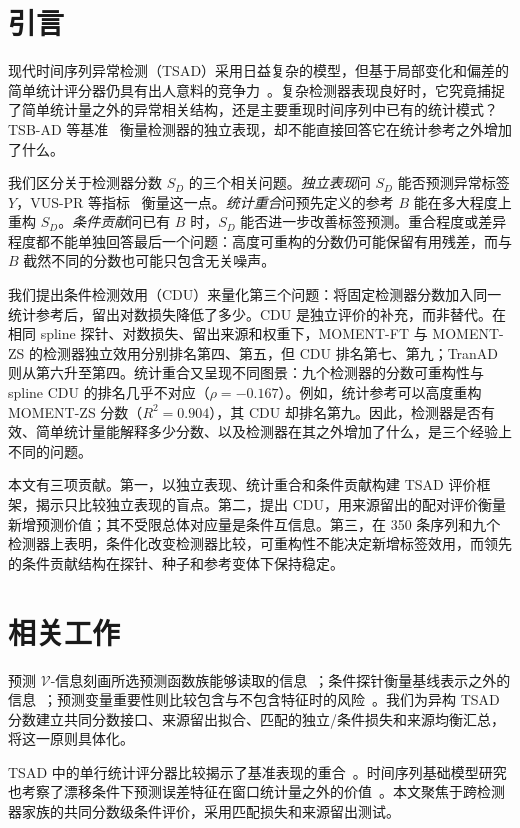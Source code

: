 \section{引言}
现代时间序列异常检测（TSAD）采用日益复杂的模型，但基于局部变化和偏差的简单统计评分器仍具有出人意料的竞争力~\cite{zhu2026oneliners}。复杂检测器表现良好时，它究竟捕捉了简单统计量之外的异常相关结构，还是主要重现时间序列中已有的统计模式？TSB-AD 等基准~\cite{liu2024tsbad} 衡量检测器的独立表现，却不能直接回答它在统计参考之外增加了什么。

我们区分关于检测器分数 $S_D$ 的三个相关问题。\emph{独立表现}问 $S_D$ 能否预测异常标签 $Y$，VUS-PR 等指标~\cite{paparrizos2022vus} 衡量这一点。\emph{统计重合}问预先定义的参考 $B$ 能在多大程度上重构 $S_D$。\emph{条件贡献}问已有 $B$ 时，$S_D$ 能否进一步改善标签预测。重合程度或差异程度都不能单独回答最后一个问题：高度可重构的分数仍可能保留有用残差，而与 $B$ 截然不同的分数也可能只包含无关噪声。

我们提出条件检测效用（CDU）来量化第三个问题：将固定检测器分数加入同一统计参考后，留出对数损失降低了多少。CDU 是独立评价的补充，而非替代。在相同 spline 探针、对数损失、留出来源和权重下，MOMENT-FT 与 MOMENT-ZS 的检测器独立效用分别排名第四、第五，但 CDU 排名第七、第九；TranAD 则从第六升至第四。统计重合又呈现不同图景：九个检测器的分数可重构性与 spline CDU 的排名几乎不对应（$\rho=-0.167$）。例如，统计参考可以高度重构 MOMENT-ZS 分数（$R^2=0.904$），其 CDU 却排名第九。因此，检测器是否有效、简单统计量能解释多少分数、以及检测器在其之外增加了什么，是三个经验上不同的问题。

本文有三项贡献。第一，以独立表现、统计重合和条件贡献构建 TSAD 评价框架，揭示只比较独立表现的盲点。第二，提出 CDU，用来源留出的配对评价衡量新增预测价值；其不受限总体对应量是条件互信息。第三，在 350 条序列和九个检测器上表明，条件化改变检测器比较，可重构性不能决定新增标签效用，而领先的条件贡献结构在探针、种子和参考变体下保持稳定。

\section{相关工作}
预测 $\mathcal V$-信息刻画所选预测函数族能够读取的信息~\cite{xu2020usable}；条件探针衡量基线表示之外的信息~\cite{hewitt2021conditional}；预测变量重要性则比较包含与不包含特征时的风险~\cite{williamson2023importance}。我们为异构 TSAD 分数建立共同分数接口、来源留出拟合、匹配的独立/条件损失和来源均衡汇总，将这一原则具体化。

TSAD 中的单行统计评分器比较揭示了基准表现的重合~\cite{zhu2026oneliners}。时间序列基础模型研究也考察了漂移条件下预测误差特征在窗口统计量之外的价值~\cite{stability2026}。本文聚焦于跨检测器家族的共同分数级条件评价，采用匹配损失和来源留出测试。

